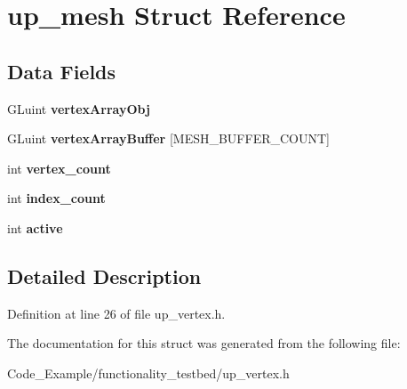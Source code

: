 \hypertarget{structup__mesh}{}\section{up\+\_\+mesh Struct Reference}
\label{structup__mesh}
\subsection*{Data Fields}
\begin{DoxyCompactItemize}
\item 
\hypertarget{structup__mesh_a80d20b159a51e21efde1f4b7952a910c}{}G\+Luint {\bfseries vertex\+Array\+Obj}\label{structup__mesh_a80d20b159a51e21efde1f4b7952a910c}

\item 
\hypertarget{structup__mesh_a71645ac6cf7a53980e1db4f5a76617f0}{}G\+Luint {\bfseries vertex\+Array\+Buffer} \mbox{[}M\+E\+S\+H\+\_\+\+B\+U\+F\+F\+E\+R\+\_\+\+C\+O\+U\+N\+T\mbox{]}\label{structup__mesh_a71645ac6cf7a53980e1db4f5a76617f0}

\item 
\hypertarget{structup__mesh_a87ded58dba0ce1a0546f3dafec3461b0}{}int {\bfseries vertex\+\_\+count}\label{structup__mesh_a87ded58dba0ce1a0546f3dafec3461b0}

\item 
\hypertarget{structup__mesh_a517085d823797b77a6ba8f2442464685}{}int {\bfseries index\+\_\+count}\label{structup__mesh_a517085d823797b77a6ba8f2442464685}

\item 
\hypertarget{structup__mesh_aa5805c5e936174e5092bf7a5b78e7e64}{}int {\bfseries active}\label{structup__mesh_aa5805c5e936174e5092bf7a5b78e7e64}

\end{DoxyCompactItemize}


\subsection{Detailed Description}


Definition at line 26 of file up\+\_\+vertex.\+h.



The documentation for this struct was generated from the following file\+:\begin{DoxyCompactItemize}
\item 
Code\+\_\+\+Example/functionality\+\_\+testbed/up\+\_\+vertex.\+h\end{DoxyCompactItemize}
